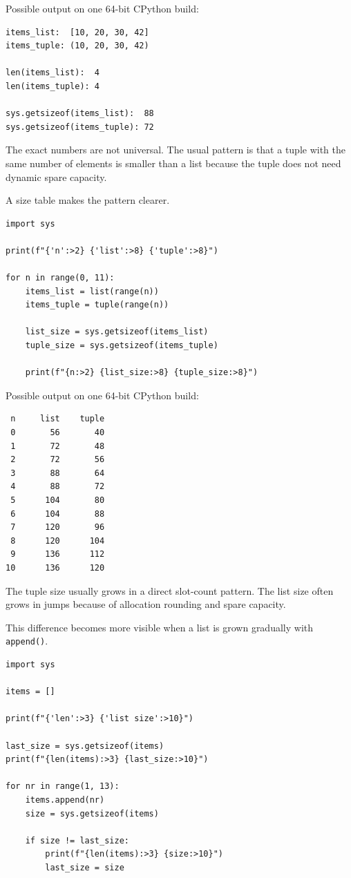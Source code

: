Possible output on one 64-bit CPython build:

\begin{verbatim}
items_list:  [10, 20, 30, 42]
items_tuple: (10, 20, 30, 42)

len(items_list):  4
len(items_tuple): 4

sys.getsizeof(items_list):  88
sys.getsizeof(items_tuple): 72
\end{verbatim}

The exact numbers are not universal. The usual pattern is that a tuple with the same number of elements is smaller than a list because the tuple does not need dynamic spare capacity.

A size table makes the pattern clearer.

\begin{verbatim}
import sys

print(f"{'n':>2} {'list':>8} {'tuple':>8}")

for n in range(0, 11):
    items_list = list(range(n))
    items_tuple = tuple(range(n))

    list_size = sys.getsizeof(items_list)
    tuple_size = sys.getsizeof(items_tuple)

    print(f"{n:>2} {list_size:>8} {tuple_size:>8}")
\end{verbatim}

Possible output on one 64-bit CPython build:

\begin{verbatim}
 n     list    tuple
 0       56       40
 1       72       48
 2       72       56
 3       88       64
 4       88       72
 5      104       80
 6      104       88
 7      120       96
 8      120      104
 9      136      112
10      136      120
\end{verbatim}

The tuple size usually grows in a direct slot-count pattern. The list size often grows in jumps because of allocation rounding and spare capacity.

This difference becomes more visible when a list is grown gradually with \texttt{append()}.

\begin{verbatim}
import sys

items = []

print(f"{'len':>3} {'list size':>10}")

last_size = sys.getsizeof(items)
print(f"{len(items):>3} {last_size:>10}")

for nr in range(1, 13):
    items.append(nr)
    size = sys.getsizeof(items)

    if size != last_size:
        print(f"{len(items):>3} {size:>10}")
        last_size = size
\end{verbatim}

